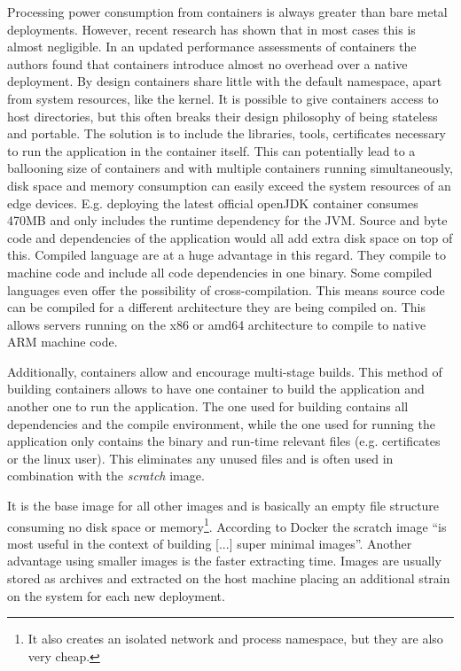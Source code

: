 Processing power consumption from containers is always greater than bare metal deployments. However, recent research has shown that in most cases this is almost negligible. In an updated performance assessments of containers the authors found that containers introduce almost no overhead over a native deployment\cite{felter2015updatedPerformanceContainers}. By design containers share little with the default namespace, apart from system resources, like the kernel. It is possible to give containers access to host directories, but this often breaks their design philosophy of being stateless and portable. The solution is to include the libraries, tools, certificates necessary to run the application in the container itself. This can potentially lead to a ballooning size of containers and with multiple containers running simultaneously, disk space and memory consumption can easily exceed the system resources of an edge devices. E.g. deploying the latest official openJDK container consumes 470MB and only includes the runtime dependency for the JVM. Source and byte code and dependencies of the application would all add extra disk space on top of this. Compiled language are at a huge advantage in this regard. They compile to machine code and include all code dependencies in one binary. Some compiled languages even offer the possibility of cross-compilation. This means source code can be compiled for a different architecture they are being compiled on. This allows servers running on the x86 or amd64 architecture to compile to native ARM machine code.

Additionally, containers allow and encourage multi-stage builds. This method of building containers allows to have one container to build the application and another one to run the application. The one used for building contains all dependencies and the compile environment, while the one used for running the application only contains the binary and run-time relevant files (e.g. certificates or the linux user). This eliminates any unused files and is often used in combination with the \textit{scratch} image. 

It is the base image for all other images and is basically an empty file structure consuming no disk space or memory\footnote{It also creates an isolated network and process namespace, but they are also very cheap.}. According to Docker the scratch image ``is most useful in the context of building [...] super minimal images''\cite{scratchImageDockerD65:online}. Another advantage using smaller images is the faster extracting time. Images are usually stored as archives and extracted on the host machine placing an additional strain on the system for each new deployment. \\[0.5mm]


